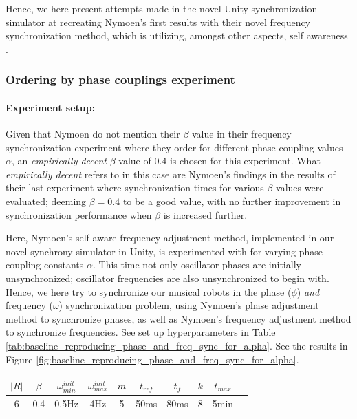 	Hence, we here present attempts made in the novel Unity synchronization simulator at recreating Nymoen's first results with their novel frequency synchronization method, which is utilizing, amongst other aspects, self awareness \cite{nymoen_synch}.
	
		\subsubsection{Ordering by phase couplings experiment}
		\label{exp:phase_and_freq_baseline_reproducing_initial_phase_ordering}
		
			\paragraph{Experiment setup:\nl}
			
			Given that Nymoen do not mention their $\beta$ value in their frequency synchronization experiment where they order for different phase coupling values $\alpha$, an \textit{empirically decent} $\beta$ value of 0.4 is chosen for this experiment. What \textit{empirically decent} refers to in this case are Nymoen's findings in the results of their last experiment \cite{nymoen_synch} where synchronization times for various $\beta$ values were evaluated; deeming $\beta=0.4$ to be a good value, with no further improvement in synchronization performance when $\beta$ is increased further.
			
			Here, Nymoen's self aware frequency adjustment method, implemented in our novel synchrony simulator in Unity, is experimented with for varying phase coupling constants $\alpha$. This time not only oscillator phases are initially unsynchronized; oscillator frequencies are also unsynchronized to begin with. Hence, we here try to synchronize our musical robots in the phase ($\phi$) \textit{and} frequency ($\omega$) synchronization problem, using Nymoen's phase adjustment method to synchronize phases, as well as Nymoen's frequency adjustment method to synchronize frequencies. See set up hyperparameters in Table \ref{tab:baseline_reproducing_phase_and_freq_sync_for_alpha}. See the results in Figure \ref{fig:baseline_reproducing_phase_and_freq_sync_for_alpha}.
			
			\begin{center}
			\begin{tabular}{ |c|c|c|c|c|c|c|c|c|c| } 
			\hline
			$|R|$ & $\beta$ & $\omega_{min}^{init}$ & $\omega_{max}^{init}$ & $m$ & $t_{ref}$ & $t_f$ & $k$ & $t_{max}$ \\
			\hline
			6 & 0.4 & 0.5Hz & 4Hz & 5 & 50ms & 80ms & 8 & 5min \\
			\hline
			\end{tabular}
			\label{tab:baseline_reproducing_phase_and_freq_sync_for_alpha}
			\end{center}
			
